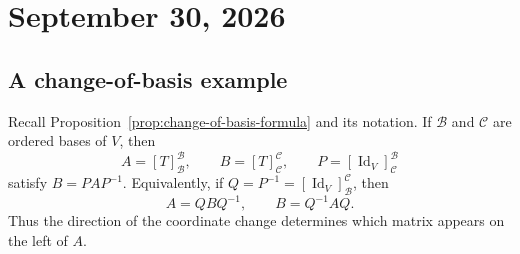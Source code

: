 \section{September 30, 2026}

\subsection{A change-of-basis example}

Recall Proposition~\ref{prop:change-of-basis-formula} and its notation.
If $\mathcal B$ and $\mathcal C$ are ordered bases of $V$, then
\[
  A=[T]_{\mathcal B}^{\mathcal B},\qquad
  B=[T]_{\mathcal C}^{\mathcal C},\qquad
  P=[\operatorname{Id}_V]_{\mathcal C}^{\mathcal B}
\]
satisfy $B=PAP^{-1}$. Equivalently, if
$Q=P^{-1}=[\operatorname{Id}_V]_{\mathcal B}^{\mathcal C}$, then
\[
  A=QBQ^{-1},\qquad B=Q^{-1}AQ.
\]
Thus the direction of the coordinate change determines which matrix
appears on the left of $A$.

